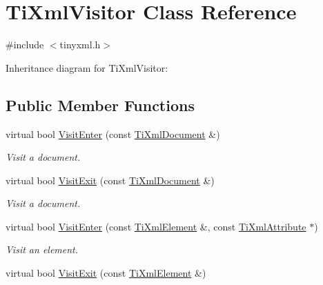 \hypertarget{class_ti_xml_visitor}{
\section{\-Ti\-Xml\-Visitor \-Class \-Reference}
\label{class_ti_xml_visitor}
}


{\ttfamily \#include $<$tinyxml.\-h$>$}



\-Inheritance diagram for \-Ti\-Xml\-Visitor\-:
\subsection*{\-Public \-Member \-Functions}
\begin{DoxyCompactItemize}
\item 
\hypertarget{class_ti_xml_visitor_a07baecb52dd7d8716ae2a48ad0956ee0}{
virtual bool \hyperlink{class_ti_xml_visitor_a07baecb52dd7d8716ae2a48ad0956ee0}{\-Visit\-Enter} (const \hyperlink{class_ti_xml_document}{\-Ti\-Xml\-Document} \&)}
\label{class_ti_xml_visitor_a07baecb52dd7d8716ae2a48ad0956ee0}

\begin{DoxyCompactList}\small\item\em \-Visit a document. \end{DoxyCompactList}\item 
\hypertarget{class_ti_xml_visitor_aa0ade4f27087447e93974e975c3246ad}{
virtual bool \hyperlink{class_ti_xml_visitor_aa0ade4f27087447e93974e975c3246ad}{\-Visit\-Exit} (const \hyperlink{class_ti_xml_document}{\-Ti\-Xml\-Document} \&)}
\label{class_ti_xml_visitor_aa0ade4f27087447e93974e975c3246ad}

\begin{DoxyCompactList}\small\item\em \-Visit a document. \end{DoxyCompactList}\item 
\hypertarget{class_ti_xml_visitor_af6c6178ffa517bbdba95d70490875fff}{
virtual bool \hyperlink{class_ti_xml_visitor_af6c6178ffa517bbdba95d70490875fff}{\-Visit\-Enter} (const \hyperlink{class_ti_xml_element}{\-Ti\-Xml\-Element} \&, const \hyperlink{class_ti_xml_attribute}{\-Ti\-Xml\-Attribute} $\ast$)}
\label{class_ti_xml_visitor_af6c6178ffa517bbdba95d70490875fff}

\begin{DoxyCompactList}\small\item\em \-Visit an element. \end{DoxyCompactList}\item 
\hypertarget{class_ti_xml_visitor_aec2b1f8116226d52f3a1b95dafd3a32c}{
virtual bool \hyperlink{class_ti_xml_visitor_aec2b1f8116226d52f3a1b95dafd3a32c}{\-Visit\-Exit} (const \hyperlink{class_ti_xml_element}{\-Ti\-Xml\-Element} \&)}
\label{class_ti_xml_visitor_aec2b1f8116226d52f3a1b95dafd3a32c}


\end{DoxyCompactItemize}
